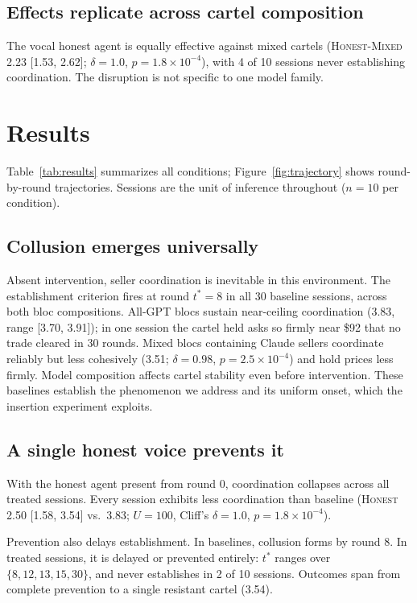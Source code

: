 \documentclass[acmsmall]{acmart}
\begin{document}
\subsection{Effects replicate across cartel composition}
The vocal honest agent is equally effective against mixed cartels (\textsc{Honest-Mixed} 2.23 [1.53, 2.62]; $\delta{=}1.0$, $p{=}1.8{\times}10^{-4}$), with 4 of 10 sessions never establishing coordination. The disruption is not specific to one model family.
\section{Results}
\label{sec:results}

Table~\ref{tab:results} summarizes all conditions; Figure~\ref{fig:trajectory}
shows round-by-round trajectories. Sessions are the unit of inference
throughout ($n{=}10$ per condition).

\subsection{Collusion emerges universally}
Absent intervention, seller coordination is inevitable in this environment.
The establishment criterion fires at round $t^{*}{=}8$ in all 30 baseline
sessions, across both bloc compositions. All-GPT blocs sustain near-ceiling
coordination (3.83, range [3.70, 3.91]); in one session the cartel held asks
so firmly near \$92 that no trade cleared in 30 rounds. Mixed blocs containing
Claude sellers coordinate reliably but less cohesively (3.51; $\delta{=}0.98$,
$p{=}2.5{\times}10^{-4}$) and hold prices less firmly. Model composition
affects cartel stability even before intervention. These baselines establish
the phenomenon we address and its uniform onset, which the insertion experiment
exploits.

\subsection{A single honest voice prevents it}
With the honest agent present from round 0, coordination collapses across all
treated sessions. Every session exhibits less coordination than baseline
(\textsc{Honest} 2.50 [1.58, 3.54] vs.\ 3.83; $U{=}100$, Cliff's $\delta{=}1.0$,
$p{=}1.8{\times}10^{-4}$).

Prevention also delays establishment. In baselines, collusion forms by round 8.
In treated sessions, it is delayed or prevented entirely: $t^{*}$ ranges over
$\{8, 12, 13, 15, 30\}$, and never establishes in 2 of 10 sessions. Outcomes
span from complete prevention to a single resistant cartel (3.54).
\end{document}

